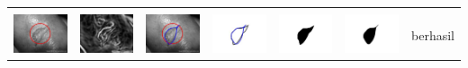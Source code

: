 \begin{table}[H]
\begin{tabular}{|m{0.7in}|m{0.7in}|m{0.7in}|m{0.7in}|m{0.7in}|m{0.7in}|m{0.7in}|}
		&  &  & & & &  \\
		\includegraphics[width=0.7in]{dataset/dataset_3/luka_kuning/ready/18_interp_init.jpg}&
		\includegraphics[width=0.7in]{dataset/dataset_3/luka_kuning/ready/18_interp_ext.jpg}&
		\includegraphics[width=0.7in]{dataset/dataset_3/luka_kuning/ready/18_interp_result.jpg}&
		\includegraphics[width=0.7in]{dataset/dataset_3/luka_kuning/ready/18_gt_r.jpg}&
		\includegraphics[width=0.7in]{dataset/dataset_3/luka_kuning/ready/18_r.jpg}&
		\includegraphics[width=0.7in]{dataset/dataset_3/luka_kuning/ready/18_interp_r.jpg}&
		berhasil\\
		\hline
		

\end{tabular}
\end{table}
